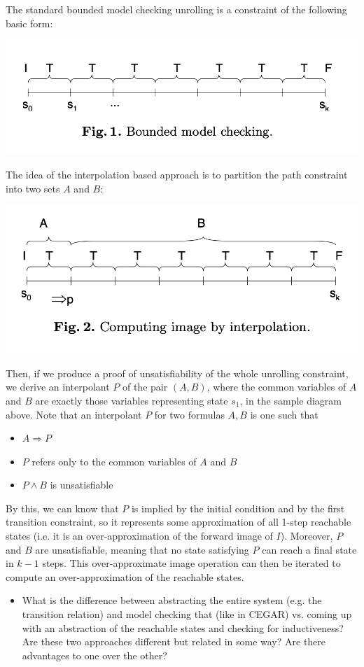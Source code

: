 \documentclass[10pt,a4paper]{article}
\begin{document}
The standard bounded model checking unrolling is a constraint of the following basic form:
\begin{center}
    \includegraphics[scale=0.38]{images/bmc.png}
\end{center}
The idea of the interpolation based approach is to partition the path constraint into two sets $A$ and $B$:
\begin{center}
    \includegraphics[scale=0.38]{images/bmc-interpolant.png}   
\end{center}
Then, if we produce a proof of unsatisfiability of the whole unrolling constraint, we derive an interpolant $P$ of the pair $(A,B)$, where the common variables of $A$ and $B$ are exactly those variables representing state $s_1$, in the sample diagram above. Note that an interpolant $P$ for two formulas $A,B$ is one such that 
\begin{itemize}
    \item $A \Rightarrow P$
    \item $P$ refers only to the common variables of $A$ and $B$
    \item $P \wedge B$ is unsatisfiable
\end{itemize}

By this, we can know that $P$ is implied by the initial condition and by the first transition constraint, so it represents some approximation of all 1-step reachable states (i.e. it is an over-approximation of the forward image of $I$). Moreover, $P$ and $B$ are unsatisfiable, meaning that no state satisfying $P$ can reach a final state in $k-1$ steps. This over-approximate image operation can then be iterated to compute an over-approximation of the reachable states. 

\begin{itemize}
    \item What is the difference between abstracting the entire system (e.g. the transition relation) and model checking that (like in CEGAR) vs. coming up with an abstraction of the reachable states and checking for inductiveness? Are these two approaches different but related in some way? Are there advantages to one over the other?
\end{itemize}



\end{document}
